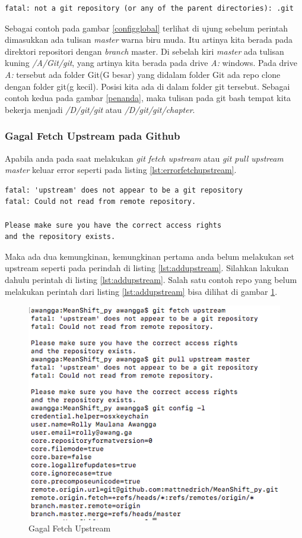 \begin{lstlisting}[caption=Kesalahan karena bukan pada direktori repositori,label={lst:errorbukanrepo}]
fatal: not a git repository (or any of the parent directories): .git
\end{lstlisting}

Sebagai contoh pada gambar \ref{configglobal} terlihat di ujung sebelum perintah dimasukkan ada tulisan \textit{master} warna biru muda. Itu artinya kita berada pada direktori repositori dengan \textit{branch} master. Di sebelah kiri \textit{master} ada tulisan kuning \textit{/A/Git/git}, yang artinya kita berada pada drive \textit{A:} windows. Pada drive \textit{A:} tersebut ada folder Git(G besar) yang didalam folder Git ada repo clone dengan folder git(g kecil). Posisi kita ada di dalam folder git tersebut.
Sebagai contoh kedua pada gambar \ref{penanda}, maka tulisan pada git bash tempat kita bekerja menjadi \textit{/D/git/git} atau \textit{/D/git/git/chapter}.

\subsubsection{Gagal Fetch Upstream pada Github}
Apabila anda pada saat melakukan \textit{git fetch upstream} atau \textit{git pull upstream master} keluar error seperti pada listing \ref{lst:errorfetchupstream}. 
\begin{lstlisting}[caption=Gagal melakukan fetch upstream,label={lst:errorfetchupstream}]
fatal: 'upstream' does not appear to be a git repository
fatal: Could not read from remote repository.

Please make sure you have the correct access rights
and the repository exists.
\end{lstlisting}
Maka ada dua kemungkinan, kemungkinan pertama anda belum melakukan set upstream seperti pada perindah di listing \ref{lst:addupstream}. Silahkan lakukan dahulu perintah di listing \ref{lst:addupstream}. Salah satu contoh repo yang belum melakukan perintah dari listing \ref{lst:addupstream} bisa dilihat di gambar \ref{errorfetch}.

\begin{figure}[!htbp]
\centerline{\includegraphics[width=.75\textwidth]{Figures/errorfetch}}
\caption{Gagal Fetch Upstream}
\label{errorfetch}
\end{figure}

